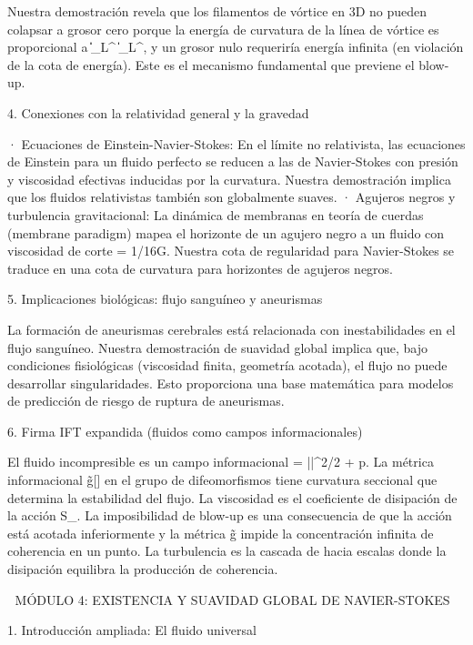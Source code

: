 \documentclass[12pt,a4paper]{book}
\begin{document}
Nuestra demostración revela que los filamentos de vórtice en 3D no pueden colapsar a grosor cero porque la energía de curvatura de la línea de vórtice es proporcional a \|\boldsymbol{\omega}\|_{L^\infty} \log \|\boldsymbol{\omega}\|_{L^\infty}, y un grosor nulo requeriría energía infinita (en violación de la cota de energía). Este es el mecanismo fundamental que previene el blow-up.

4. Conexiones con la relatividad general y la gravedad

· Ecuaciones de Einstein-Navier-Stokes: En el límite no relativista, las ecuaciones de Einstein para un fluido perfecto se reducen a las de Navier-Stokes con presión y viscosidad efectivas inducidas por la curvatura. Nuestra demostración implica que los fluidos relativistas también son globalmente suaves.
· Agujeros negros y turbulencia gravitacional: La dinámica de membranas en teoría de cuerdas (membrane paradigm) mapea el horizonte de un agujero negro a un fluido con viscosidad de corte \eta = 1/16\pi G. Nuestra cota de regularidad para Navier-Stokes se traduce en una cota de curvatura para horizontes de agujeros negros.

5. Implicaciones biológicas: flujo sanguíneo y aneurismas

La formación de aneurismas cerebrales está relacionada con inestabilidades en el flujo sanguíneo. Nuestra demostración de suavidad global implica que, bajo condiciones fisiológicas (viscosidad finita, geometría acotada), el flujo no puede desarrollar singularidades. Esto proporciona una base matemática para modelos de predicción de riesgo de ruptura de aneurismas.

6. Firma IFT expandida (fluidos como campos informacionales)

El fluido incompresible es un campo informacional \rho = ||^2/2 + p. La métrica informacional g̃[\rho] en el grupo de difeomorfismos tiene curvatura seccional que determina la estabilidad del flujo. La viscosidad \nu es el coeficiente de disipación de la acción S_{}. La imposibilidad de blow-up es una consecuencia de que la acción está acotada inferiormente y la métrica g̃ impide la concentración infinita de coherencia en un punto. La turbulencia es la cascada de \rho hacia escalas donde la disipación equilibra la producción de coherencia.

🧬 MÓDULO 4: EXISTENCIA Y SUAVIDAD GLOBAL DE NAVIER-STOKES

1. Introducción ampliada: El fluido universal
\end{document}
